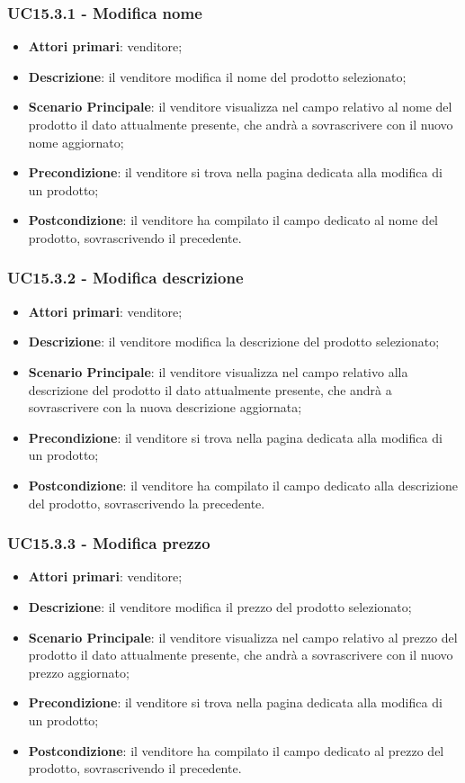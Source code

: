 \subsubsection{UC15.3.1 - Modifica nome}
\begin{itemize}
\item \textbf{Attori primari}: venditore;
\item \textbf{Descrizione}: il venditore modifica il nome del prodotto selezionato;
\item \textbf{Scenario Principale}: il venditore visualizza nel campo relativo al nome del prodotto il dato attualmente presente, che andrà a sovrascrivere con il nuovo nome aggiornato;
\item \textbf{Precondizione}: il venditore si trova nella pagina dedicata alla modifica di un prodotto;
\item \textbf{Postcondizione}: il venditore ha compilato il campo dedicato al nome del prodotto, sovrascrivendo il precedente.
\end{itemize}

\subsubsection{UC15.3.2 - Modifica descrizione}
\begin{itemize}
\item \textbf{Attori primari}: venditore;
\item \textbf{Descrizione}: il venditore modifica la descrizione del prodotto selezionato;
\item \textbf{Scenario Principale}: il venditore visualizza nel campo relativo alla descrizione del prodotto il dato attualmente presente, che andrà a sovrascrivere con la nuova descrizione aggiornata;
\item \textbf{Precondizione}: il venditore si trova nella pagina dedicata alla modifica di un prodotto;
\item \textbf{Postcondizione}: il venditore ha compilato il campo dedicato alla descrizione del prodotto, sovrascrivendo la precedente.
\end{itemize}

\subsubsection{UC15.3.3 - Modifica prezzo}
\begin{itemize}
\item \textbf{Attori primari}: venditore;
\item \textbf{Descrizione}: il venditore modifica il prezzo del prodotto selezionato;
\item \textbf{Scenario Principale}: il venditore visualizza nel campo relativo al prezzo del prodotto il dato attualmente presente, che andrà a sovrascrivere con il nuovo prezzo aggiornato;
\item \textbf{Precondizione}: il venditore si trova nella pagina dedicata alla modifica di un prodotto;
\item \textbf{Postcondizione}: il venditore ha compilato il campo dedicato al prezzo del prodotto, sovrascrivendo il precedente.
\end{itemize}


